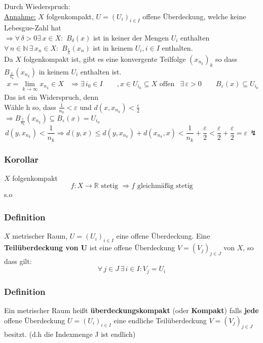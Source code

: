  
 Durch Wiederspruch: \\
 \underline{Annahme:} $X$ folgenkompakt, $U=(U_i)_{i \in I}$ offene Überdeckung, welche keine Lebesgue-Zahl hat \\
 $\Rightarrow \forall\, \delta >0 \exists\, x \in X:$ $B_{\delta}(x)$ ist in keiner der Mengen $U_i$ enthalten \\
 $\forall\, n \in \mathbb{N} \, \exists\, x_n \in X:$ $B_{\frac{1}{n}}(x_n)$ ist in keinem $U_i, i \in I$ enthalten. \\
 Da $X$ folgenkompakt ist, gibt es eine konvergente Teilfolge $(x_{n_k})_k$ so dass $B_{\frac{1}{n_k}}(x_{n_k})$ in keinem $U_i$ enthalten ist.
 \begin{align*}
 	x = \lim_{k \to \infty}x_{n_k} \in X & \Rightarrow \exists\,i_0 \in I \qquad ,x \in U_{i_0} \subseteq X \text{ offen}
	& \exists\,\varepsilon>0 \qquad B_{\varepsilon}(x) \subseteq U_{i_0}
 \end{align*}  
 Das ist ein Widerspruch, denn \\
 Wähle h so, dass $\frac{1}{n_k}< \varepsilon$ und $d(x,x_{n_k}) < \frac{\varepsilon}{2}$ \\
 $\Rightarrow B_{\frac{1}{n_k}}(x_{n_k}) \subseteq B_{\varepsilon}(x)=U_{i_0}$
 \[
 	d(y,x_{n_k})<\frac{1}{n_k} \Rightarrow d(y,x) \leq d(y,x_{n_k})+d(x_{n_k},x) < \frac{1}{n_k}+\frac{\varepsilon}{2} < \frac{\varepsilon}{2}+ \frac{\varepsilon}{2} = \varepsilon \,  \lightning
 \] 
 \bewende
 
 \subsubsection{Korollar} %
 \label{ssub:korollar}
 $X$ folgenkompakt
 \[
 	f:X \to \mathbb{R} \text{ stetig } \Rightarrow f \text{ gleichmäßig stetig} 
 \]
  s.o
 
\subsubsection{Definition} %
\label{ssub:definition}
$X$ metrischer Raum, $U=(U_i)_{i \in I}$ eine offene Überdeckung. Eine {\bfseries Teilüberdeckung von U} ist eine offene Überdeckung $V=(V_j)_{j \in J}$ von $X$, so dass gilt: 
\[
	\forall\, j \in J \,\exists\,i \in I: V_j = U_i
\]
\subsubsection{Definition} %
\label{ssub:definition}
Ein metrischer Raum heißt {\bfseries überdeckungskompakt} (oder {\bfseries Kompakt}) falls {\bfseries jede} offene Überdeckung $U=(U_i)_{i \in I}$ eine endliche Teilüberdeckung $V=(V_j)_{j \in J}$ besitzt. (d.h die Indexmenge J ist endlich)
